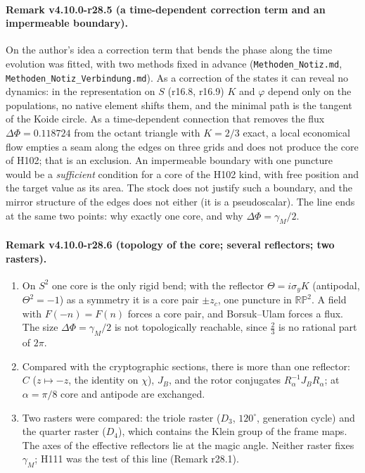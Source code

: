 \paragraph{Remark v4.10.0-r28.5 (a time-dependent correction term and an impermeable boundary).}
On the author's idea a correction term that bends the phase along the time evolution was fitted, with two methods fixed in advance
(\texttt{Methoden\_\allowbreak Notiz.md}, \texttt{Methoden\_\allowbreak Notiz\_\allowbreak Verbindung.md}).  As a correction of the states it can
reveal no dynamics: in the representation on \(S\) (r16.8, r16.9) \(K\) and \(\varphi\) depend only on the populations, no native element
shifts them, and the minimal path is the tangent of the Koide circle.  As a time-dependent connection that removes the flux
\(\Delta\Phi=0.118724\) from the octant triangle with \(K=2/3\) exact, a local economical flow empties a seam along the edges on three grids
and does not produce the core of H102; that is an exclusion.  An impermeable boundary with one puncture would be a \emph{sufficient}
condition for a core of the H102 kind, with free position and the target value as its area.  The stock does not justify such a boundary,
and the mirror structure of the edges does not either (it is a pseudoscalar).  The line ends at the same two points: why exactly one core,
and why \(\Delta\Phi=\gamma_M/2\).

\paragraph{Remark v4.10.0-r28.6 (topology of the core; several reflectors; two rasters).}
\begin{enumerate}[leftmargin=2em]
\item[(a)] On \(S^2\) one core is the only rigid bend; with the reflector \(\Theta=i\sigma_yK\) (antipodal, \(\Theta^2=-1\)) as a symmetry
it is a core pair \(\pm z_c\), one puncture in \(\mathbb{RP}^2\).  A field with \(F(-n)=F(n)\) forces a core pair, and Borsuk--Ulam forces a
flux.  The size \(\Delta\Phi=\gamma_M/2\) is not topologically reachable, since \(\tfrac23\) is no rational part of \(2\pi\).
\item[(b)] Compared with the cryptographic sections, there is more than one reflector: \(C\) (\(z\mapsto-z\), the identity on \(\chi\)),
\(J_B\), and the rotor conjugates \(R_\alpha^{-1}J_BR_\alpha\); at \(\alpha=\pi/8\) core and antipode are exchanged.
\item[(c)] Two rasters were compared: the triole raster (\(D_3\), \(120^\circ\), generation cycle) and the quarter raster (\(D_4\)), which
contains the Klein group of the frame maps.  The axes of the effective reflectors lie at the magic angle.  Neither raster fixes
\(\gamma_M\); H111 was the test of this line (Remark r28.1).
\end{enumerate}

